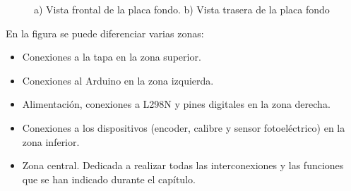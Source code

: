 \begin{figure}[htpb]
{    }
    \caption{a) Vista frontal de la placa fondo. b) Vista trasera de la placa fondo}
    \label{fig:placafondo} 
    \end{figure} 

En la figura se puede diferenciar varias zonas:

\begin{itemize}
    \item Conexiones a la tapa en la zona superior.
    \item Conexiones al Arduino en la zona izquierda.
    \item Alimentación, conexiones a L298N y pines digitales en la zona derecha.
    \item Conexiones a los dispositivos (encoder, calibre y sensor fotoeléctrico) en la zona inferior.
    \item Zona central. Dedicada a realizar todas las interconexiones y las funciones que se han 
    indicado durante el capítulo.
\end{itemize}